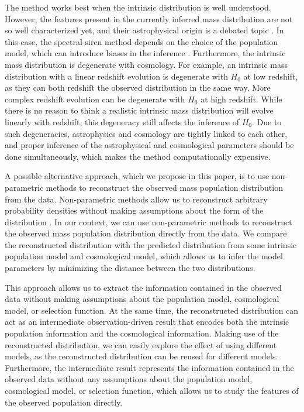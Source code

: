 \documentclass[sn-aps, pdflatex, iicol]{sn-jnl}
\begin{document}
The method works best when the intrinsic distribution is well understood.
However, the features present in the currently inferred mass distribution are not so well characterized yet, and their astrophysical origin is a debated topic \citep{Zevin:2017evb, Mapelli:2020vfa, Zevin:2020gbd, Mandel:2018hfr, Marchant:2023wno}.
In this case, the spectral-siren method depends on the choice of the population model, which can introduce biases in the inference \citep{Mukherjee:2021rtw, Mastrogiovanni:2021wsd, Pierra:2023deu, LIGOScientific:2020kqk, KAGRA:2021duu, LIGOScientific:2021aug}.
Furthermore, the intrinsic mass distribution is degenerate with cosmology.
For example, an intrinsic mass distribution with a linear redshift evolution is degenerate with $H_0$ at low redshift, as they can both redshift the observed distribution in the same way.
More complex redshift evolution can be degenerate with $H_0$ at high redshift.
While there is no reason to think a realistic intrinsic mass distribution will evolve linearly with redshift, this degeneracy still affects the inference of $H_0$.
Due to such degeneracies, astrophysics and cosmology are tightly linked to each other, and proper inference of the astrophysical and cosmological parameters should be done simultaneously, which makes the method computationally expensive.

A possible alternative approach, which we propose in this paper, is to use non-parametric methods to reconstruct the observed mass population distribution from the data.
Non-parametric methods allow us to reconstruct arbitrary probability densities without making assumptions about the form of the distribution \citep{Rinaldi:2021bhm}.
In our context, we can use non-parametric methods to reconstruct the observed mass population distribution directly from the data.
We compare the reconstructed distribution with the predicted distribution from some intrinsic population model and cosmological model, which allows us to infer the model parameters by minimizing the distance between the two distributions.

This approach allows us to extract the information contained in the observed data without making assumptions about the population model, cosmological model, or selection function.
At the same time, the reconstructed distribution can act as an intermediate observation-driven result that encodes both the intrinsic population information and the cosmological information.
Making use of the reconstructed distribution, we can easily explore the effect of using different models, as the reconstructed distribution can be reused for different models.
Furthermore, the intermediate result represents the information contained in the observed data without any assumptions about the population model, cosmological model, or selection function, which allows us to study the features of the observed population directly.
\end{document}
